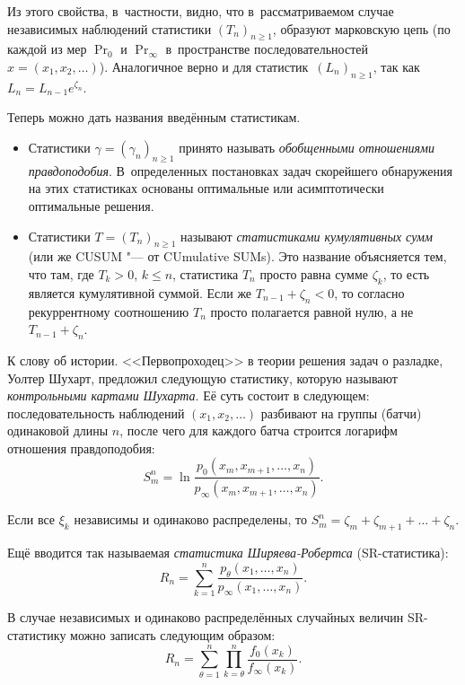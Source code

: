Из этого свойства, в~частности, видно, что в~рассматриваемом случае независимых наблюдений статистики \((T_{n})_{n \geq 1}\), образуют марковскую цепь (по каждой из мер \(\Pr_{0}\) и \(\Pr_{\infty}\) в~пространстве последовательностей \(x = (x_1, x_2, \ldots)\)). 
Аналогичное верно и для статистик~\((L_{n})_{n \geq 1}\), так как \(L_{n} = L_{n - 1}e^{\zeta_{n}}\).

Теперь можно дать названия введённым статистикам.
\begin{itemize}
	\item Статистики \(\gamma = (\gamma_{n})_{n \geq 1}\) принято называть \emph{обобщенными отношениями правдоподобия}. 
	В~определенных постановках задач скорейшего обнаружения на этих статистиках основаны оптимальные или асимптотически оптимальные решения.
	
	\item Статистики \(T = (T_{n})_{n \geq 1}\) называют \emph{статистиками кумулятивных сумм} (или же CUSUM "--- от CUmulative SUMs). 
	Это название объясняется тем, что там, где \(T_{k} > 0\), \(k \leq n\), статистика \(T_{n}\) просто равна сумме \(\zeta_{k}\), то есть является кумулятивной суммой. 
	Если же \(T_{n - 1} + \zeta_{n} < 0\), то согласно рекуррентному соотношению \(T_{n}\) просто полагается равной нулю, а не \(T_{n - 1} + \zeta_{n}\).
\end{itemize}

К слову об истории. 
<<Первопроходец>> в теории решения задач о разладке, Уолтер Шухарт, предложил следующую статистику, которую называют \emph{контрольными картами Шухарта}. 
Её суть состоит в следующем: последовательность наблюдений \((x_{1}, x_{2}, \ldots)\) разбивают на группы (батчи) одинаковой длины \(n\), после чего для каждого батча строится логарифм отношения правдоподобия:
\[
	S_{m}^{n} = \ln\frac{p_{0}(x_{m}, x_{m + 1}, \ldots, x_{n})}{p_{\infty}(x_{m}, x_{m + 1}, \ldots, x_{n})}.
\]

Если все \(\xi_{k}\) независимы и одинаково распределены, то \(S_{m}^{n} = \zeta_{m} + \zeta_{m + 1} + \ldots + \zeta_{n}\).

Ещё вводится так называемая \emph{статистика Ширяева-Робертса} (SR-статистика):
\[
	R_{n} 
	= \sum_{k = 1}^{n} \frac{p_{\theta}(x_{1}, \ldots, x_{n})}{p_{\infty}(x_{1}, \ldots, x_{n})}.
\]

В случае независимых и одинаково распределённых случайных величин SR-статистику можно записать следующим образом:
\[
	R_{n} 
	= \sum_{\theta = 1}^{n} \prod_{k = \theta}^{n} \frac{f_{0}(x_{k})}{f_{\infty}(x_{k})}.
\]

